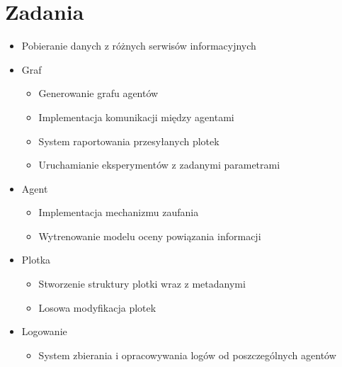 \documentclass{article}
\begin{document}
	\section{Zadania}
	\begin{itemize}
	\item Pobieranie danych z różnych serwisów informacyjnych
	\item Graf
		\begin{itemize}
		\item Generowanie grafu agentów
		\item Implementacja komunikacji między agentami
		\item System raportowania przesyłanych plotek
		\item Uruchamianie eksperymentów z zadanymi parametrami
		\end{itemize}
	\item Agent
		\begin{itemize}
		\item Implementacja mechanizmu zaufania
		\item Wytrenowanie modelu oceny powiązania informacji
		\end{itemize}
	\item Plotka
		\begin{itemize}
		\item Stworzenie struktury plotki wraz z metadanymi
		\item Losowa modyfikacja plotek
		\end{itemize}
	\item Logowanie
		\begin{itemize}
		\item System zbierania i opracowywania logów od poszczególnych agentów
		\end{itemize}
	\end{itemize}
\end{document}
